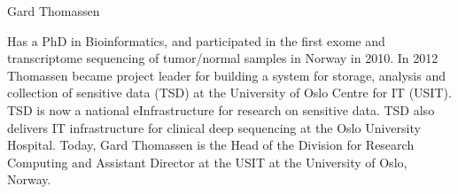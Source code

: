 \begin{participant}[gender=male]{Gard Thomassen}






  \medskip Has a PhD in Bioinformatics, and participated in the first exome and transcriptome
sequencing of tumor/normal samples in Norway in 2010. In 2012 Thomassen became project leader for
building a system for storage, analysis and collection of sensitive data (TSD) at the University of Oslo Centre for IT (USIT). TSD is now a national eInfrastructure for research on sensitive data. TSD also delivers IT infrastructure for clinical deep sequencing at the Oslo University Hospital. Today, Gard Thomassen is the Head of the Division for Research Computing and Assistant Director at the USIT at the University of Oslo, Norway.

\end{participant}

